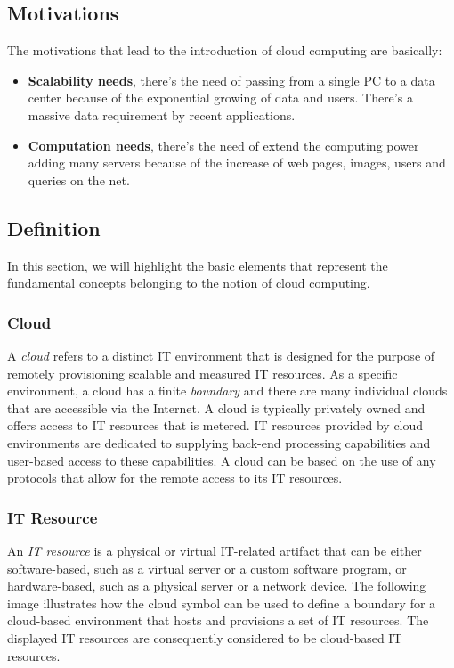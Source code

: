\subsection{Motivations}
The motivations that lead to the introduction of cloud computing are basically:
\begin{itemize}
	\item \textbf{Scalability needs}, there's the need of passing from a single PC to a data center because of the exponential growing of data and users. There's a massive data requirement by recent applications.
	\item \textbf{Computation needs}, there's the need of extend the computing power adding many servers because of the increase of web pages, images, users and queries on the net.
\end{itemize}

\subsection{Definition}
In this section, we will highlight the basic elements that represent the fundamental concepts belonging to the notion of cloud computing.

\subsubsection{Cloud}
A \textit{cloud} refers to a distinct IT environment that is designed for the purpose of remotely provisioning scalable and measured IT resources. As a specific environment, a cloud has a finite \textit{boundary} and there are many individual clouds that are accessible via the Internet. A cloud is typically privately owned and offers access to IT resources that is metered. IT resources provided by cloud environments are dedicated to supplying back-end processing capabilities and user-based access to these capabilities. A cloud can be based on the use of any protocols that allow for the remote access to its IT resources.

\subsubsection{IT Resource}
An \textit{IT resource} is a physical or virtual IT-related artifact that can be either software-based, such as a virtual server or a custom software program, or hardware-based, such as a physical server or a network device.
The following image illustrates how the cloud symbol can be used to define a boundary for a cloud-based environment that hosts and provisions a set of IT resources. The displayed IT resources are consequently considered to be cloud-based IT resources.

